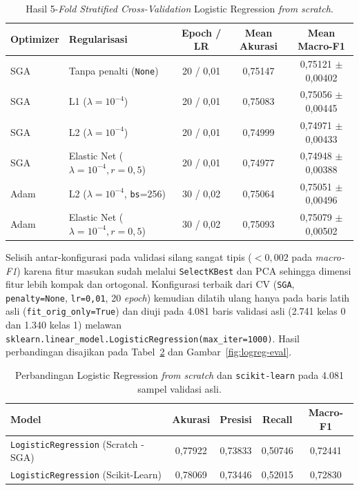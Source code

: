 \begin{table}[htbp]
  \centering
  \caption{Hasil 5-\textit{Fold Stratified Cross-Validation} Logistic Regression \textit{from scratch}.}
  \label{tab:logreg-cv}
  \footnotesize
  \begin{tabular}{llccc}
    \toprule
    \textbf{Optimizer} & \textbf{Regularisasi} & \textbf{Epoch / LR} & \textbf{Mean Akurasi} & \textbf{Mean Macro-F1} \\
    \midrule
    SGA  & Tanpa penalti (\texttt{None}) & 20 / 0,01 & 0,75147 & 0,75121 $\pm$ 0,00402 \\
    SGA  & L1 ($\lambda = 10^{-4}$) & 20 / 0,01 & 0,75083 & 0,75056 $\pm$ 0,00445 \\
    SGA  & L2 ($\lambda = 10^{-4}$) & 20 / 0,01 & 0,74999 & 0,74971 $\pm$ 0,00433 \\
    SGA  & Elastic Net ($\lambda = 10^{-4}, r = 0{,}5$) & 20 / 0,01 & 0,74977 & 0,74948 $\pm$ 0,00388 \\
    Adam & L2 ($\lambda = 10^{-4}$, \texttt{bs}=256) & 30 / 0,02 & 0,75064 & 0,75051 $\pm$ 0,00496 \\
    Adam & Elastic Net ($\lambda = 10^{-4}, r = 0{,}5$) & 30 / 0,02 & 0,75093 & 0,75079 $\pm$ 0,00502 \\
    \bottomrule
  \end{tabular}
\end{table}

Selisih antar-konfigurasi pada validasi silang sangat tipis ($< 0{,}002$ pada
\textit{macro-F1}) karena fitur masukan sudah melalui \texttt{SelectKBest} dan
PCA sehingga dimensi fitur lebih kompak dan ortogonal. Konfigurasi terbaik dari
CV (\texttt{SGA}, \texttt{penalty=None}, \texttt{lr=0,01}, 20 \textit{epoch})
kemudian dilatih ulang hanya pada baris latih asli (\texttt{fit\_orig\_only=True})
dan diuji pada 4.081 baris validasi asli (2.741 kelas 0 dan 1.340 kelas 1)
melawan \texttt{sklearn.linear\_model.LogisticRegression(max\_iter=1000)}.
Hasil perbandingan disajikan pada Tabel~\ref{tab:logreg-sklearn} dan
Gambar~\ref{fig:logreg-eval}.

\begin{table}[htbp]
  \centering
  \caption{Perbandingan Logistic Regression \textit{from scratch} dan \texttt{scikit-learn} pada 4.081 sampel validasi asli.}
  \label{tab:logreg-sklearn}
  \footnotesize
  \begin{tabular}{lcccc}
    \toprule
    \textbf{Model} & \textbf{Akurasi} & \textbf{Presisi} & \textbf{Recall} & \textbf{Macro-F1} \\
    \midrule
    \texttt{LogisticRegression} (Scratch - SGA) & 0,77922 & 0,73833 & 0,50746 & 0,72441 \\
    \texttt{LogisticRegression} (Scikit-Learn)  & 0,78069 & 0,73446 & 0,52015 & 0,72830 \\
    \bottomrule
  \end{tabular}
\end{table}

